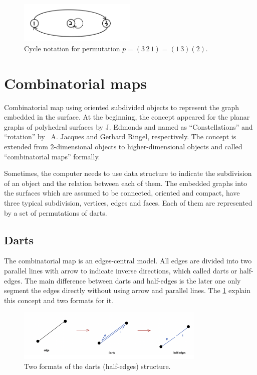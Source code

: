 \begin{figure}[htb]
  \centering
  \includegraphics[width=0.5\textwidth]{../../image/cycleperm.png}
  \caption{Cycle notation for permutation \(p=(3\,2\,1)=(1\,3)(2)\).}
  \label{fig:figures:cycleperm}
\end{figure}

\section{Combinatorial maps}

Combinatorial map using oriented subdivided objects to represent the graph embedded in the surface. At the beginning, the concept appeared for the planar graphs of polyhedral surfaces by J. Edmonds \cite{edmonds1960combinatorial} and named as “Constellations” \cite{jacques1969constellations} and “rotation” \cite{ringel2012map} by  A. Jacques and Gerhard Ringel, respectively. The concept is extended from 2-dimensional objects to higher-dimensional objects and called “combinatorial maps” formally.

Sometimes, the computer needs to use data structure to indicate the subdivision of an object and the relation between each of them. The embedded graphs into the surfaces which are assumed to be connected, oriented and compact\cite{nlab:map}, have three typical subdivision, vertices, edges and faces. Each of them are represented by a set of permutations of darts.  

\subsection{Darts}
The combinatorial map is an edges-central model. All edges are divided into two parallel lines with arrow to indicate inverse directions, which called darts or half-edges. The main difference between darts and half-edges is the later one only segment the edges directly without using arrow and parallel lines. The \cref{fig:figures:cycleperm} explain this concept and two formats for it.

\begin{figure}[htb]
  \centering
  \includegraphics[width=0.8\textwidth]{../../image/darts.png}
  \caption{Two formats of the darts (half-edges) structure.}
  \label{fig:figures:darts}
\end{figure}


